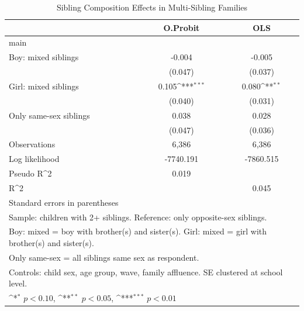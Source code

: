 \documentclass[12pt]{article}
\begin{document}
\begin{table}[htbp]\centering
\def\sym#1{\ifmmode^{#1}\else\(^{#1}\)\fi}
\caption{Sibling Composition Effects in Multi-Sibling Families\label{tab:composition}}
\begin{tabular}{l*{2}{c}}
\toprule
                &\multicolumn{1}{c}{O.Probit}&\multicolumn{1}{c}{OLS}\\
\midrule
main            &                  &                  \\
Boy: mixed siblings&   -0.004         &   -0.005         \\
                &  (0.047)         &  (0.037)         \\
Girl: mixed siblings&    0.105\sym{***}&    0.080\sym{**} \\
                &  (0.040)         &  (0.031)         \\
Only same-sex siblings&    0.038         &    0.028         \\
                &  (0.047)         &  (0.036)         \\
\midrule
Observations    &    6,386         &    6,386         \\
Log likelihood  &-7740.191         &-7860.515         \\
Pseudo R^2      &    0.019         &                  \\
R^2             &                  &    0.045         \\
\bottomrule
\multicolumn{3}{l}{\footnotesize Standard errors in parentheses}\\
\multicolumn{3}{l}{\footnotesize Sample: children with 2+ siblings. Reference: only opposite-sex siblings.}\\
\multicolumn{3}{l}{\footnotesize Boy: mixed = boy with brother(s) and sister(s). Girl: mixed = girl with brother(s) and sister(s).}\\
\multicolumn{3}{l}{\footnotesize Only same-sex = all siblings same sex as respondent.}\\
\multicolumn{3}{l}{\footnotesize Controls: child sex, age group, wave, family affluence. SE clustered at school level.}\\
\multicolumn{3}{l}{\footnotesize \sym{*} \(p<0.10\), \sym{**} \(p<0.05\), \sym{***} \(p<0.01\)}\\
\end{tabular}
\end{table}
\end{document}
